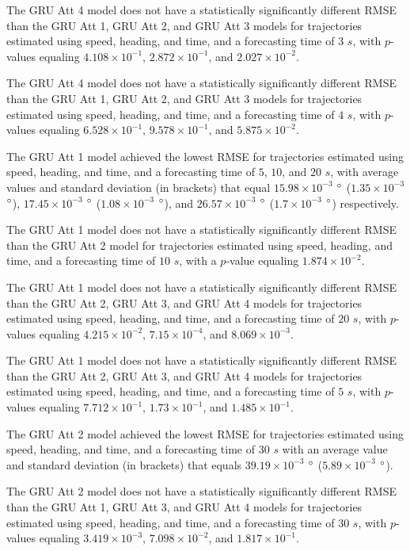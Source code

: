 \documentclass[preprint,12pt]{elsarticle}
\begin{document}
The GRU Att 4 model does not have a statistically significantly different RMSE than the GRU Att 1, GRU Att 2, and GRU Att 3 models for trajectories estimated using speed, heading, and time, and a forecasting time of $3$ $s$, with $p$-values equaling $4.108 \times 10^{-1}$, $2.872 \times 10^{-1}$, and $2.027 \times 10^{-2}$.

The GRU Att 4 model does not have a statistically significantly different RMSE than the GRU Att 1, GRU Att 2, and GRU Att 3 models for trajectories estimated using speed, heading, and time, and a forecasting time of $4$ $s$, with $p$-values equaling $6.528 \times 10^{-1}$, $9.578 \times 10^{-1}$, and $5.875 \times 10^{-2}$.

The GRU Att 1 model achieved the lowest RMSE for trajectories estimated using speed, heading, and time, and a forecasting time of $5$, $10$, and $20$ $s$,  with average values and standard deviation (in brackets) that equal $15.98 \times 10^{-3}$ $\degree$ ($1.35 \times 10^{-3}$ $\degree$), $17.45 \times 10^{-3}$ $\degree$ ($1.08 \times 10^{-3}$ $\degree$), and $26.57 \times 10^{-3}$ $\degree$ ($1.7 \times 10^{-3}$ $\degree$) respectively.

The GRU Att 1 model does not have a statistically significantly different RMSE than the GRU Att 2 model for trajectories estimated using speed, heading, and time, and a forecasting time of $10$ $s$, with a $p$-value equaling $1.874 \times 10^{-2}$.

The GRU Att 1 model does not have a statistically significantly different RMSE than the GRU Att 2, GRU Att 3, and GRU Att 4 models for trajectories estimated using speed, heading, and time, and a forecasting time of $20$ $s$, with $p$-values equaling $4.215 \times 10^{-2}$, $7.15 \times 10^{-4}$, and $8.069 \times 10^{-3}$.

The GRU Att 1 model does not have a statistically significantly different RMSE than the GRU Att 2, GRU Att 3, and GRU Att 4 models for trajectories estimated using speed, heading, and time, and a forecasting time of $5$ $s$, with $p$-values equaling $7.712 \times 10^{-1}$, $1.73 \times 10^{-1}$, and $1.485 \times 10^{-1}$.

The GRU Att 2 model achieved the lowest RMSE for trajectories estimated using speed, heading, and time, and a forecasting time of $30$ $s$ with an average value and standard deviation (in brackets) that equals $39.19 \times 10^{-3}$ $\degree$ ($5.89 \times 10^{-3}$ $\degree$).

The GRU Att 2 model does not have a statistically significantly different RMSE than the GRU Att 1, GRU Att 3, and GRU Att 4 models for trajectories estimated using speed, heading, and time, and a forecasting time of $30$ $s$, with $p$-values equaling $3.419 \times 10^{-3}$, $7.098 \times 10^{-2}$, and $1.817 \times 10^{-1}$.
 
\end{document}
